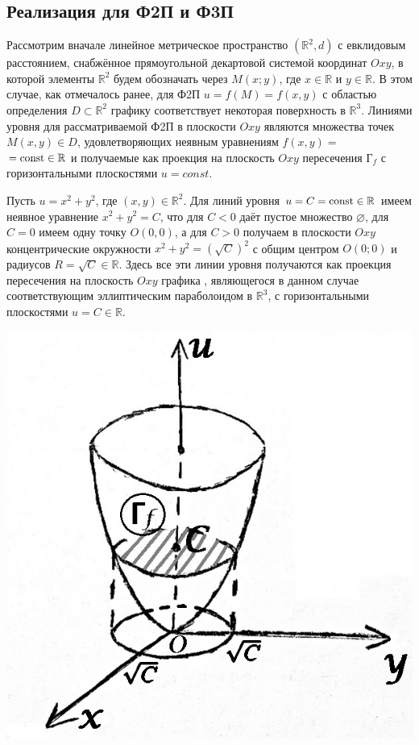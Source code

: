 \subsection{Реализация для Ф2П и Ф3П}
Рассмотрим вначале линейное метрическое пространство $ (\mathbb{R}^2, d) $ с евклидовым расстоянием, снабжённое прямоугольной декартовой системой координат $ Oxy $,
в которой элементы $ \mathbb{R}^2 $ будем обозначать через $ M(x; y) $, где
$ x \in \mathbb{R} $ и $ y \in \mathbb{R} $. В этом случае, как отмечалось ранее, для Ф2П $ u=f(M)=f(x,y) $ с областью определения $ D \subset \mathbb{R}^2 $ графику 
соответствует некоторая поверхность в $ \mathbb{R}^3 $. Линиями уровня для рассматриваемой Ф2П в плоскости $ Oxy $ являются множества точек $ M(x, y) \in D $, удовлетворяющих неявным уравнениям
$ f(x, y) = $ \\
$ = \operatorname{\text{const}} \in \mathbb{R} $ и получаемые как проекция на плоскость $ Oxy $ пересечения $ \text{Г}_f $ с горизонтальными плоскостями $ u = const $.

\begin{example}
    Пусть $ u = x^2 + y^2 $, где $ (x,y) \in \mathbb{R}^2 $. Для линий уровня $ u = C = \operatorname{\text{const}}  \in \mathbb{R} $ имеем неявное уравнение $ x^2 + y^2 = C $, что для $ C < 0 $ даёт пустое
    множество $ \varnothing $, для $ C = 0 $ имеем одну точку $ O(0,0) $, а для  $ C > 0 $ получаем в плоскости $ Oxy $ концентрические окружности
    $ x^2 + y^2 = \left(\sqrt{C}\right)^2 $ с общим центром $ O(0; 0) $ и радиусов $ R = \sqrt{C} \in \mathbb{R} $.
    Здесь все эти линии уровня получаются как проекция пересечения на плоскость $ Oxy $ графика , являющегося в данном случае соответствующим эллиптическим параболоидом
    в $ \mathbb{R}^3 $, с горизонтальными плоскостями $ u =  C \in \mathbb{R} $.

    \begin{center}
        \includegraphics[scale=0.4]{img/2_3.jpg}
    \end{center}
\end{example}

